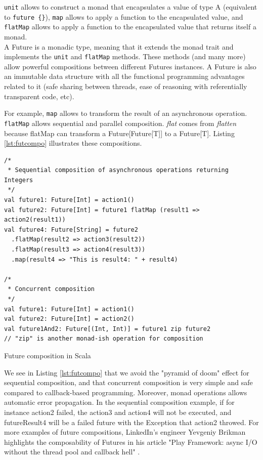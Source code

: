 \verb|unit| allows to construct a monad that encapsulates a value of type A (equivalent to \verb|future {}|), \verb|map| allows to apply a function to 
the encapsulated value, and \verb|flatMap| allows to apply a function to the encapsulated value that returns itself a monad.
\\

A Future is a monadic type, meaning that it extends the monad trait and implements the \verb|unit| and \verb|flatMap| methods.
These methods (and many more) allow powerful compositions between different Futures instances. A Future is also an immutable
data structure with all the functional programming advantages related to it (safe sharing between threads, ease of reasoning with referentially transparent code, etc).

For example, \verb|map| allows to transform the result of an asynchronous operation. \verb|flatMap| allows sequential and 
parallel composition. \textit{flat} comes from \textit{flatten} because flatMap can transform a Future[Future[T]] to a Future[T].
Listing \ref{lst:futcompo} illustrates these compositions.

\begin{listing}[h]
\begin{verbatim}
/*
 * Sequential composition of asynchronous operations returning Integers
 */
val future1: Future[Int] = action1()
val future2: Future[Int] = future1 flatMap (result1 => action2(result1))
val future4: Future[String] = future2
  .flatMap(result2 => action3(result2))
  .flatMap(result3 => action4(result3))
  .map(result4 => "This is result4: " + result4)

/*
 * Concurrent composition
 */
val future1: Future[Int] = action1()
val future2: Future[Int] = action2()
val future1And2: Future[(Int, Int)] = future1 zip future2
// "zip" is another monad-ish operation for composition 
\end{verbatim}
\caption{Future composition in Scala}
\label{lst:futcompo}
\end{listing}

We see in Listing \ref{lst:futcompo} that we avoid the "pyramid of doom" effect for sequential composition, and that concurrent composition is very simple and safe
compared to callback-based programming. Moreover, monad operations allows automatic error propagation. In the sequential composition example,
if for instance action2 failed, the action3 and action4 will not be executed, and futureResult4 will be a failed future with the Exception
that action2 throwed. For more examples of future compositions, LinkedIn's engineer Yevgeniy Brikman highlights the composability of Futures in his article
"Play Framework: async I/O without the thread pool and callback hell" .
\\

